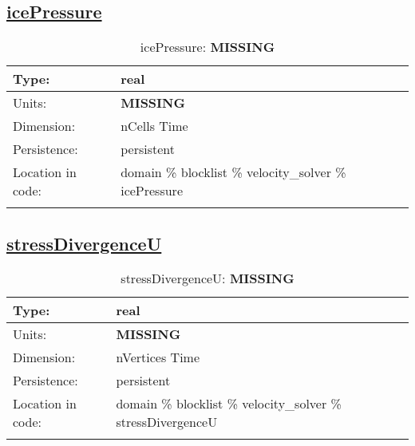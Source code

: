 \subsection[icePressure]{\hyperref[sec:var_tab_velocity_solver]{icePressure}}
\label{subsec:var_sec_velocity_solver_icePressure}
\begin{center}
\begin{longtable}{| p{2.0in} | p{4.0in} |}
        \hline 
        Type: & real \\
        \hline 
        Units: & {\bf \color{red} MISSING} \\
        \hline 
        Dimension: & nCells Time \\
        \hline 
        Persistence: & persistent \\
        \hline 
         Location in code: & domain \% blocklist \% velocity\_solver \% icePressure \\
         \hline 
    \caption{icePressure: {\bf \color{red} MISSING}}
\end{longtable}
\end{center}
\subsection[stressDivergenceU]{\hyperref[sec:var_tab_velocity_solver]{stressDivergenceU}}
\label{subsec:var_sec_velocity_solver_stressDivergenceU}
\begin{center}
\begin{longtable}{| p{2.0in} | p{4.0in} |}
        \hline 
        Type: & real \\
        \hline 
        Units: & {\bf \color{red} MISSING} \\
        \hline 
        Dimension: & nVertices Time \\
        \hline 
        Persistence: & persistent \\
        \hline 
         Location in code: & domain \% blocklist \% velocity\_solver \% stressDivergenceU \\
         \hline 
    \caption{stressDivergenceU: {\bf \color{red} MISSING}}
\end{longtable}
\end{center}
